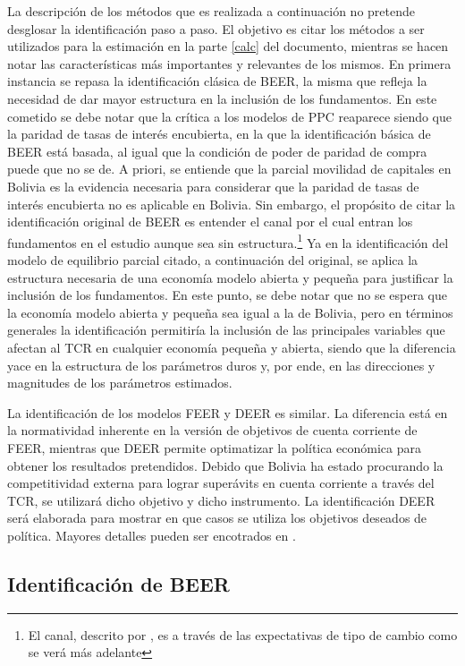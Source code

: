 \documentclass[12pt,letterpaper]{article}
\begin{document}
La descripción de los métodos  que es realizada a continuación no pretende desglosar la identificación paso a paso. El objetivo es citar los métodos a ser utilizados para la estimación en la parte \ref{calc} del documento, mientras se hacen notar las características más importantes y relevantes de los mismos. En primera instancia se repasa la identificación clásica de BEER, la misma que refleja la necesidad de dar mayor estructura en la inclusión de los fundamentos. En este cometido se debe notar que la crítica a los modelos de PPC reaparece siendo que la paridad de tasas de interés encubierta, en la que la identificación básica de BEER está basada, al igual que la condición de poder de paridad de compra puede que no se de. A priori, se entiende que la parcial movilidad de capitales en Bolivia es la evidencia necesaria para considerar que la paridad de tasas de interés encubierta no es aplicable en Bolivia. Sin embargo, el propósito de citar la identificación original de BEER es entender el canal por el cual entran los fundamentos en el estudio aunque sea sin estructura.\footnote{El canal, descrito por \cite{clark1999exchange}, es a través de las expectativas de tipo de cambio como se verá más adelante} Ya en la identificación del modelo de equilibrio parcial citado, a continuación del original, se aplica la estructura necesaria de una economía modelo abierta y pequeña para justificar la inclusión de los fundamentos. En este punto, se debe notar que no se espera que la economía modelo abierta y pequeña sea igual a la de Bolivia, pero en términos generales la identificación permitiría la inclusión de las principales variables que afectan al TCR en cualquier economía pequeña y abierta, siendo que la diferencia yace en la estructura de los parámetros duros y, por ende, en las direcciones y magnitudes de los parámetros estimados.

La identificación de los modelos FEER y DEER es similar. La diferencia está en la normatividad inherente en la versión de objetivos de cuenta corriente de FEER, mientras que DEER permite optimatizar la política económica para obtener los resultados pretendidos. Debido que Bolivia ha estado procurando la competitividad externa para lograr superávits en cuenta corriente a través del TCR, se utilizará dicho objetivo y dicho instrumento. La identificación DEER será elaborada para mostrar en que casos se utiliza los objetivos deseados de política. Mayores detalles pueden ser encotrados en \cite{james2012handbook}.		

\subsection*{Identificación de BEER}
\end{document}
